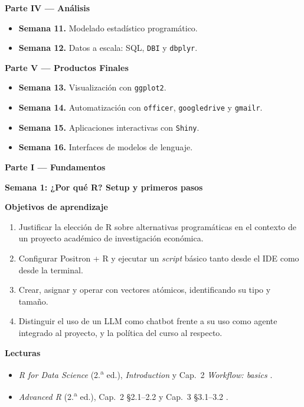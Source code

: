 \documentclass[11pt,letterpaper]{article}
\newcommand{\parteCurso}[1]{%
  \clearpage%
  \vspace*{0.5cm}%
  {\centering\color{main}\fontsize{26pt}{32pt}\selectfont\bfseries #1\par}%
  \vspace{0.8cm}%
}
\newcommand{\semana}[2]{%
  \bigskip%
  {\color{main}\Large\bfseries Semana #1: #2\par}%
  \smallskip%
}
\begin{document}
\smallskip
\noindent\textbf{\textcolor{main}{Parte IV --- Análisis}}
\begin{itemize}[leftmargin=*, itemsep=1pt]
    \item \textbf{Semana 11.} Modelado estadístico programático.
    \item \textbf{Semana 12.} Datos a escala: SQL, \texttt{DBI} y \texttt{dbplyr}.
\end{itemize}

\smallskip
\noindent\textbf{\textcolor{main}{Parte V --- Productos Finales}}
\begin{itemize}[leftmargin=*, itemsep=1pt]
    \item \textbf{Semana 13.} Visualización con \texttt{ggplot2}.
    \item \textbf{Semana 14.} Automatización con \texttt{officer}, \texttt{googledrive} y \texttt{gmailr}.
    \item \textbf{Semana 15.} Aplicaciones interactivas con \texttt{Shiny}.
    \item \textbf{Semana 16.} Interfaces de modelos de lenguaje.
\end{itemize}

\parteCurso{Parte I --- Fundamentos}

\semana{1}{¿Por qué R? Setup y primeros pasos}

\medskip
\noindent\textbf{Objetivos de aprendizaje}
\begin{enumerate}[leftmargin=*, itemsep=1pt]
    \item Justificar la elección de R sobre alternativas programáticas en el contexto de un proyecto académico de investigación económica.
    \item Configurar Positron + R y ejecutar un \textit{script} básico tanto desde el IDE como desde la terminal.
    \item Crear, asignar y operar con vectores atómicos, identificando su tipo y tamaño.
    \item Distinguir el uso de un LLM como chatbot frente a su uso como agente integrado al proyecto, y la política del curso al respecto.
\end{enumerate}

\noindent\textbf{Lecturas}
\begin{itemize}[leftmargin=*, itemsep=1pt]
    \item \textit{R for Data Science} (2.\textsuperscript{a} ed.), \textit{Introduction} y Cap.\ 2 \textit{Workflow: basics} \cite{wickham2023r4ds}.
    \item \textit{Advanced R} (2.\textsuperscript{a} ed.), Cap.\ 2 §2.1--2.2 y Cap.\ 3 §3.1--3.2 \cite{wickham2019advr}.
\end{itemize}
\end{document}
